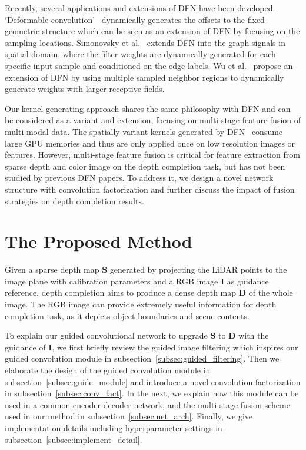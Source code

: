 \documentclass[journal]{IEEEtran}
\begin{document}
Recently, several applications and extensions of DFN have been developed.
`Deformable convolution'~\cite{deformable_conv} dynamically generates the offsets to the fixed geometric structure
which can be seen as an extension of DFN by focusing on the sampling locations.
Simonovsky et al.~\cite{edge_condition_filter} extends DFN into the graph signals in spatial domain,
where the filter weights are dynamically generated for each specific input sample and conditioned on the edge labels.
Wu et al.~\cite{large_dynamic_filter} propose an extension of DFN by using multiple sampled neighbor regions to dynamically generate weights with larger receptive fields.


Our kernel generating approach shares the same philosophy with DFN and can be considered as a variant and extension, focusing on multi-stage feature fusion of multi-modal data.    
The spatially-variant kernels generated by DFN~\cite{dynamic_filter} consume large GPU memories and thus are only applied once on low resolution images or features. 
However, multi-stage feature fusion is critical for feature extraction from sparse depth and color image on the depth completion task, but has not been studied by previous DFN papers.  
To address it, we design a novel network structure with convolution factorization and further discuss the impact of fusion strategies on depth completion results.
 

\section{The Proposed Method}
Given a sparse depth map $\mathbf{S}$ generated by projecting the LiDAR points to the image plane with calibration parameters and
a RGB image $\mathbf{I}$ as guidance reference,
depth completion aims to produce a dense depth map $\mathbf{D}$ of the whole image.
The RGB image can provide extremely useful information for depth completion task, as it depicts object boundaries and scene contents. 

To explain our guided convolutional network to upgrade $\mathbf{S}$ to $\mathbf{D}$ with the guidance of $\mathbf{I}$,
we first briefly review the guided image filtering which inspires our guided convolution module in subsection~\ref{subsec:guided_filtering}.
Then we elaborate the design of the guided convolution module in subsection~\ref{subsec:guide_module} and introduce a novel convolution factorization in subsection~\ref{subsec:conv_fact}.
In the next, we explain how this module can be used in a common encoder-decoder network, and the multi-stage fusion scheme used in our method in subsection~\ref{subsec:net_arch}.
Finally, we give implementation details including hyperparameter settings in subsection~\ref{subsec:implement_detail}.
\end{document}
